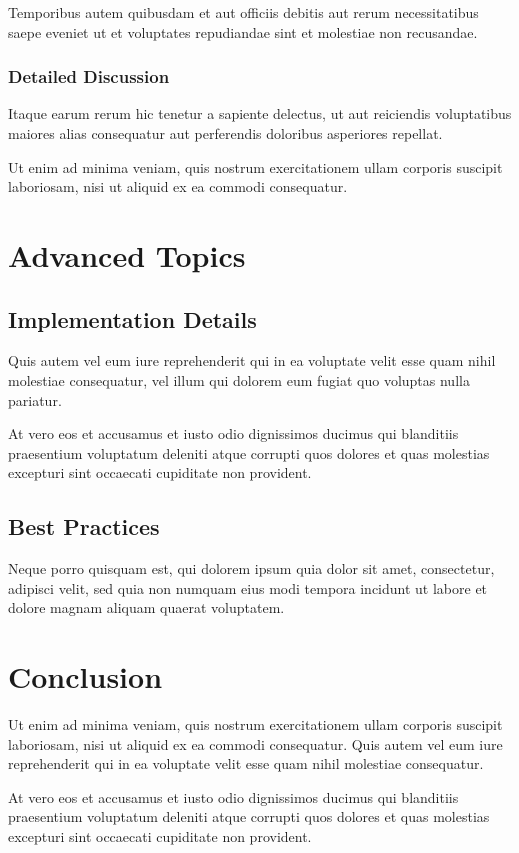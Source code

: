 \documentclass[11pt,twoside,openright,twocolumn]{book}
\begin{document}
Temporibus autem quibusdam et aut officiis debitis aut rerum necessitatibus saepe eveniet ut et voluptates repudiandae sint et molestiae non recusandae.

\subsection{Detailed Discussion}

Itaque earum rerum hic tenetur a sapiente delectus, ut aut reiciendis voluptatibus maiores alias consequatur aut perferendis doloribus asperiores repellat.

Ut enim ad minima veniam, quis nostrum exercitationem ullam corporis suscipit laboriosam, nisi ut aliquid ex ea commodi consequatur.

\chapter{Advanced Topics}

\section{Implementation Details}

Quis autem vel eum iure reprehenderit qui in ea voluptate velit esse quam nihil molestiae consequatur, vel illum qui dolorem eum fugiat quo voluptas nulla pariatur.

At vero eos et accusamus et iusto odio dignissimos ducimus qui blanditiis praesentium voluptatum deleniti atque corrupti quos dolores et quas molestias excepturi sint occaecati cupiditate non provident.

\section{Best Practices}

Neque porro quisquam est, qui dolorem ipsum quia dolor sit amet, consectetur, adipisci velit, sed quia non numquam eius modi tempora incidunt ut labore et dolore magnam aliquam quaerat voluptatem.

\chapter{Conclusion}

Ut enim ad minima veniam, quis nostrum exercitationem ullam corporis suscipit laboriosam, nisi ut aliquid ex ea commodi consequatur. Quis autem vel eum iure reprehenderit qui in ea voluptate velit esse quam nihil molestiae consequatur.

At vero eos et accusamus et iusto odio dignissimos ducimus qui blanditiis praesentium voluptatum deleniti atque corrupti quos dolores et quas molestias excepturi sint occaecati cupiditate non provident.


% 
% 

\end{document}
